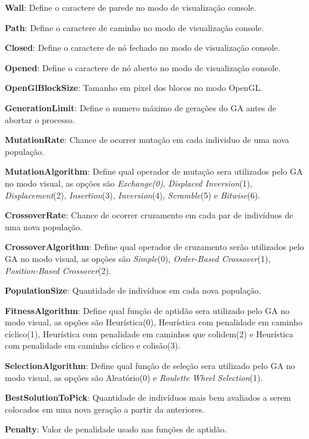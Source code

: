 \textbf{Wall}: Define o caractere de parede no modo de visualização console.

\textbf{Path}: Define o caractere de caminho no modo de visualização console.

\textbf{Closed}: Define o caractere de nó fechado no modo de visualização console.

\textbf{Opened}: Define o caractere de nó aberto no modo de visualização console.

\textbf{OpenGlBlockSize}: Tamanho em pixel dos blocos no modo OpenGL.


\textbf{GenerationLimit}: Define o numero máximo de gerações do GA antes de abortar o processo.

\textbf{MutationRate}: Chance de ocorrer mutação em cada individuo de uma nova população.

\textbf{MutationAlgorithm}:  Define qual operador de mutação sera utilizados pelo GA no modo visual, as opções são  \textit{Exchange(0)}, \textit{Displaced Inversion}(1), \textit{Displacement}(2), \textit{Insertion}(3), \textit{Inversion}(4), \textit{Scramble}(5) e \textit{Bitwise}(6).

\textbf{CrossoverRate}: Chance de ocorrer cruzamento em cada par de indivíduos de uma nova população.

\textbf{CrossoverAlgorithm}: Define qual operador de cruzamento serão utilizados pelo GA no modo visual, as opções são  \textit{Simple}(0), \textit{Order-Based Crossover}(1), \textit{Position-Based Crossover}(2).

\textbf{PopulationSize}: Quantidade de indivíduos em cada nova população.

\textbf{FitnessAlgorithm}: Define qual função de aptidão sera utilizado pelo GA no modo visual, as opções são Heurística(0), Heurística com penalidade em caminho cíclico(1), Heurística com penalidade em caminhos que colidem(2) e Heurística com penalidade em caminho cíclico e colisão(3).

\textbf{SelectionAlgorithm}: Define qual função de seleção sera utilizado pelo GA no modo visual, as opções são  Aleatório(0) e \textit{Roulette Wheel Selection}(1).

\textbf{BestSolutionToPick}: Quantidade de indivíduos mais bem avaliados a serem colocados em uma nova geração a partir da anteriores.

\textbf{Penalty}: Valor de penalidade usado nas funções de aptidão.
